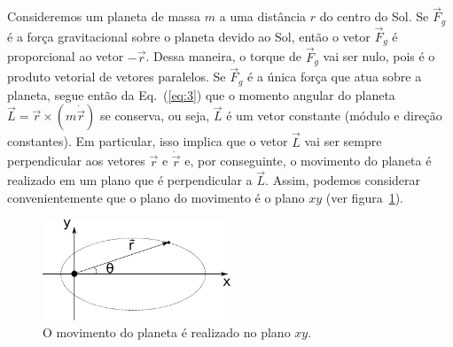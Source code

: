 \documentclass[twocolumn=on,fontsize=12pt,DIV=calc]{scrartcl}
\theoremstyle{definition}
\begin{document}
Consideremos um planeta de massa $m$ a uma distância $r$ do centro do
Sol. Se $\vec F_g$ é a força gravitacional sobre o planeta devido ao
Sol, então o vetor $\vec F_g$ é proporcional ao vetor $-\vec r$. Dessa
maneira, o torque de $\vec F_g$ vai ser nulo, pois é o produto
vetorial de vetores paralelos. Se $\vec F_g$ é a única força que atua
sobre a planeta, segue então da Eq.~(\ref{eq:3}) que o momento angular
do planeta $\vec L=\vec r\times (m\dot{\vec r})$ se conserva, ou seja,
$\vec L$ é um vetor constante (módulo e direção constantes). Em
particular, isso implica que o vetor $\vec L$ vai ser sempre
perpendicular aos vetores $\vec r$ e $\dot{\vec r}$ e, por
conseguinte, o movimento do planeta é realizado em um plano que é
perpendicular a $\vec L$. Assim, podemos considerar convenientemente
que o plano do movimento é o plano $xy$ (ver
figura~\ref{fig:leikepler2r}).

\begin{figure}[ht]
  \centering
  \includegraphics[width=0.5\textwidth,keepaspectratio]{aux/leikepler2r.pdf}
  \caption{O movimento do planeta é realizado no plano $xy$.}
  \label{fig:leikepler2r}
\end{figure}
\end{document}
